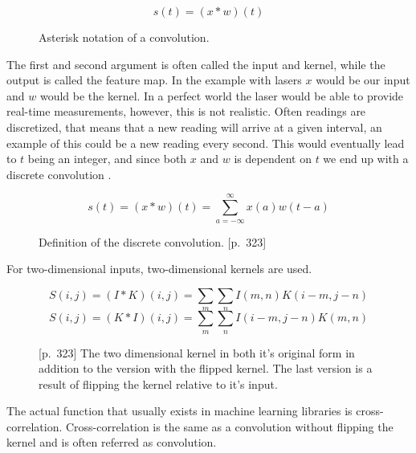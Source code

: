 \begin{figure}[H]
    \label{fig:conv_asterisk}
    \begin{equation}
        s(t) = (x*w)(t)
    \end{equation}
    \caption{Asterisk notation of a convolution.}
\end{figure}

The first and second argument is often called the input and kernel, while the output is called the feature map. In the example with lasers $x$ would be our input and $w$ would be the kernel. %
In a perfect world the laser would be able to provide real-time measurements, however, this is not realistic. Often readings are discretized, that means that a new reading will arrive at a given interval, an example of this could be a new reading every second. This would eventually lead to $t$ being an integer, and since both $x$ and $w$ is dependent on $t$ we end up with a discrete convolution \parencite{goodfellow_deep_2016}.

\begin{figure}[H]
    \label{fig:disc_conv}
    \begin{equation}
        s(t) = (x*w)(t) = \sum_{a=-\infty}^{\infty} x(a)w(t-a)
    \end{equation}
    \caption{Definition of the discrete convolution. \cite{goodfellow_deep_2016}[p.~323]}
\end{figure}

For two-dimensional inputs, two-dimensional kernels are used.

\begin{figure}[H]
    \label{fig:disc_conv2d}
    \begin{equation}
        S(i,j) = (I*K)(i,j) = \sum_{m} \sum_{n} I(m,n)K(i-m,j-n)
    \end{equation}
    \begin{equation}
        S(i,j) = (K*I)(i,j) = \sum_{m} \sum_{n} I(i-m,j-n)K(m,n)
    \end{equation}
    \caption{\cite{goodfellow_deep_2016}[p.~323] The two dimensional kernel in both it's original form in addition to the version with the flipped kernel. The last version is a result of flipping the kernel relative to it's input.}
\end{figure}

The actual function that usually exists in machine learning libraries is cross-correlation. Cross-correlation is the same as a convolution without flipping the kernel and is often referred as convolution.

